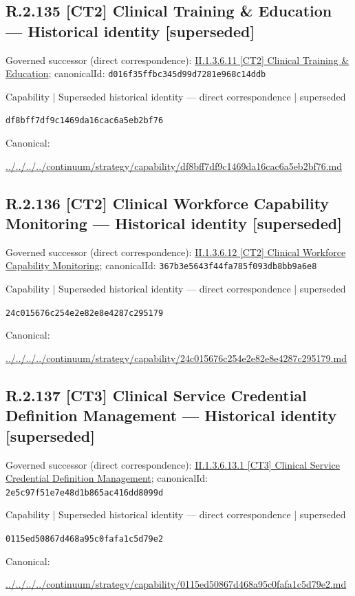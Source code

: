 \documentclass[10pt,a4paper]{article}
\begin{document}
\subsection*{R.2.135 [CT2] Clinical Training \& Education — Historical identity [superseded]}
Governed successor (direct correspondence): \hyperref[element-d016f35ffbc345d99d7281e968c14ddb]{II.1.3.6.11 [CT2] Clinical Training \& Education}; canonicalId: \texttt{d016f35ffbc345d99d7281e968c14ddb}\par
\label{element-df8bff7df9c1469da16cac6a5eb2bf76}
{\small Capability | Superseded historical identity — direct correspondence | superseded}\par
\texttt{df8bff7df9c1469da16cac6a5eb2bf76}\par
Canonical: \par
{\footnotesize\url{../../../../continuum/strategy/capability/df8bff7df9c1469da16cac6a5eb2bf76.md}}\par
\subsection*{R.2.136 [CT2] Clinical Workforce Capability Monitoring — Historical identity [superseded]}
Governed successor (direct correspondence): \hyperref[element-367b3e5643f44fa785f093db8bb9a6e8]{II.1.3.6.12 [CT2] Clinical Workforce Capability Monitoring}; canonicalId: \texttt{367b3e5643f44fa785f093db8bb9a6e8}\par
\label{element-24c015676c254e2e82e8e4287c295179}
{\small Capability | Superseded historical identity — direct correspondence | superseded}\par
\texttt{24c015676c254e2e82e8e4287c295179}\par
Canonical: \par
{\footnotesize\url{../../../../continuum/strategy/capability/24c015676c254e2e82e8e4287c295179.md}}\par
\subsection*{R.2.137 [CT3] Clinical Service Credential Definition Management — Historical identity [superseded]}
Governed successor (direct correspondence): \hyperref[element-2e5c97f51e7e48d1b865ac416dd8099d]{II.1.3.6.13.1 [CT3] Clinical Service Credential Definition Management}; canonicalId: \texttt{2e5c97f51e7e48d1b865ac416dd8099d}\par
\label{element-0115ed50867d468a95c0fafa1c5d79e2}
{\small Capability | Superseded historical identity — direct correspondence | superseded}\par
\texttt{0115ed50867d468a95c0fafa1c5d79e2}\par
Canonical: \par
{\footnotesize\url{../../../../continuum/strategy/capability/0115ed50867d468a95c0fafa1c5d79e2.md}}\par
\end{document}
